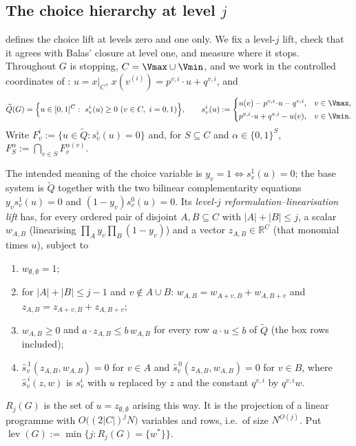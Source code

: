 
\subsection{The choice hierarchy at level \texorpdfstring{$j$}{j}}\label{xc:sec-lift}

 defines the choice lift at levels zero and one only.  We fix a
level-$j$ lift, check that it agrees with Balas' closure at level one, and measure where it
stops.  Throughout $G$ is stopping, $C=\Vmax\cup\Vmin$, and we work in the controlled
coordinates of : $u=x|_{C}$, $x(v^{(i)})=p^{v,i}\!\cdot\!u+q^{v,i}$, and
\[
 \widetilde Q(G)=\Bigl\{u\in[0,1]^{C}:\ s^{i}_{v}(u)\ge0\ (v\in C,\ i=0,1)\Bigr\},\qquad
 s^{i}_{v}(u):=\begin{cases} u(v)-p^{v,i}\!\cdot\!u-q^{v,i}, & v\in\Vmax,\\[2pt]
 p^{v,i}\!\cdot\!u+q^{v,i}-u(v), & v\in\Vmin.\end{cases}
\]
Write $F^{i}_{v}:=\{u\in\widetilde Q:s^{i}_{v}(u)=0\}$ and, for $S\subseteq C$ and
$\alpha\in\{0,1\}^{S}$, $F^{\alpha}_{S}:=\bigcap_{v\in S}F^{\alpha(v)}_{v}$.

\begin{definition}\label{xc:def-lift}
The intended meaning of the choice variable is $y_v=1\Leftrightarrow s^{1}_{v}(u)=0$; the base
system is $\widetilde Q$ together with the two bilinear complementarity equations
$y_vs^{1}_{v}(u)=0$ and $(1-y_v)s^{0}_{v}(u)=0$.  Its \emph{level-$j$
reformulation--linearisation lift} has, for every ordered pair of disjoint $A,B\subseteq C$ with
$|A|+|B|\le j$, a scalar $w_{A,B}$ (linearising $\prod_{A}y_v\prod_{B}(1-y_v)$) and a vector
$z_{A,B}\in\mathbb R^{C}$ (that monomial times $u$), subject to
\begin{enumerate}[label=(L\arabic*),leftmargin=3em]
\item $w_{\emptyset,\emptyset}=1$;
\item for $|A|+|B|\le j-1$ and $v\notin A\cup B$:
      $w_{A,B}=w_{A+v,B}+w_{A,B+v}$ and $z_{A,B}=z_{A+v,B}+z_{A,B+v}$;
\item $w_{A,B}\ge0$ and $a\!\cdot\!z_{A,B}\le b\,w_{A,B}$ for every row $a\!\cdot\!u\le b$ of
      $\widetilde Q$ (the box rows included);
\item $\widehat s^{\,1}_{v}(z_{A,B},w_{A,B})=0$ for $v\in A$ and
      $\widehat s^{\,0}_{v}(z_{A,B},w_{A,B})=0$ for $v\in B$, where $\widehat s^{\,i}_{v}(z,w)$
      is $s^{i}_{v}$ with $u$ replaced by $z$ and the constant $q^{v,i}$ by $q^{v,i}w$.
\end{enumerate}
$R_j(G)$ is the set of $u=z_{\emptyset,\emptyset}$ arising this way.  It is the projection of a
linear programme with $O\bigl((2|C|)^{j}N\bigr)$ variables and rows, i.e.\ of size $N^{O(j)}$.
Put $\operatorname{lev}(G):=\min\{j:R_j(G)=\{w^{\ast}\}\}$.
\end{definition}

